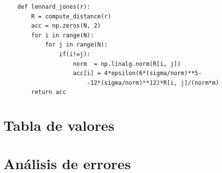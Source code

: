 \documentclass[11pt, twoside]{article} %
\begin{document}
\begin{verbatim}
    def lennard_jones(r):
        R = compute_distance(r)
        acc = np.zeros(N, 2)
        for i in range(N):
            for j in range(N):
                if(i!=j):
                    norm  = np.linalg.norm(R[i, j])
                    acc[i] = 4*epsilon(6*(sigma/norm)**5-
                        -12*(sigma/norm)**12)*R[i, j]/(norm*m)
        return acc
\end{verbatim}




\newpage

\appendix

\section{Tabla de valores}


\newpage

\section{Análisis de errores}
\end{document}
